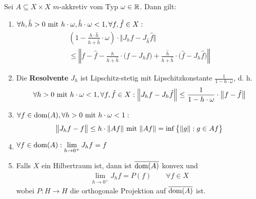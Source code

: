 \begin{theorem}\label{Theorem1.2.9}
	Sei $A\subseteq X\times X$ $m$-akkretiv vom Typ $\omega\in\R$. Dann gilt:
	\begin{enumerate}[label=(\alph*)]
		\item $\begin{aligned}
			\forall h,\hat{h}>0\mit h\cdot\omega,\hat{h}\cdot\omega<1,\forall f,\hat{f}\in X:
		\end{aligned}$
		\begin{align*}
			\left(1-\frac{h\cdot\hat{h}}{h+\hat{h}}\cdot\omega\right)\cdot\Big\Vert J_h f-J_{\hat{h}}\hat{f}\Big\Vert\\
			\leq
			\left\Vert f-\hat{f}-\frac{h}{h+\hat{h}}\cdot\big(f-J_h f\big)+\frac{\hat{h}}{h+\hat{h}}\cdot\big(\hat{f}-J_h \hat{f}\big)\right\Vert
		\end{align*}
		\item Die \textbf{Resolvente} $J_h$ ist Lipschitz-stetig mit Lipschitzkonstante $\frac{1}{1-h\cdot\omega}$, d. h.
		\begin{align*}
			\forall h>0\mit h\cdot \omega<1,\forall f,\hat{f}\in X:
			\Big\Vert J_h f- J_h\hat{f}\Big\Vert
			\leq
			\frac{1}{1-h\cdot\omega}\cdot\big\Vert f-\hat{f}\big\Vert
		\end{align*}
		\item $\begin{aligned}
			\forall f\in\dom(A),\forall h>0\mit h\cdot\omega<1:
		\end{aligned}$
		\begin{align*}
			\big\Vert J_h f-f\big\Vert
			\leq
			h\cdot\Vert A f\Vert\mit\Vert A f\Vert=\inf\big\lbrace\Vert g\Vert:g\in A f\big\rbrace
		\end{align*}
		\item $\begin{aligned}
			\forall f\in\dom(A):\lim\limits_{h\to0^+} J_h f=f
		\end{aligned}$
		\item Falls $X$ ein Hilbertraum ist, dann ist $\overline{\dom(A)}$ konvex und
		\begin{align*}
			\lim\limits_{h\to0^+} J_h f=P(f)\qquad\forall f\in X
		\end{align*}
		wobei $P:H\to H$ die orthogonale Projektion auf $\overline{\dom(A)}$ ist.
	\end{enumerate}
\end{theorem}

